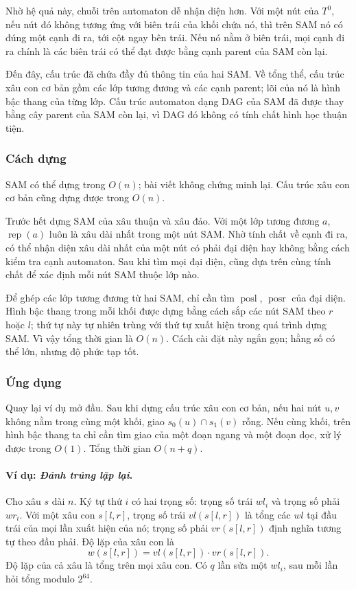 \documentclass[11pt]{article}
\begin{document}
Nhờ hệ quả này, chuỗi trên automaton dễ nhận diện hơn. Với một nút của
\(T^0\), nếu nút đó không tương ứng với biên trái của khối chứa nó, thì trên
SAM nó có đúng một cạnh đi ra, tới cột ngay bên trái. Nếu nó nằm ở biên trái,
mọi cạnh đi ra chính là các biên trái có thể đạt được bằng cạnh parent của
SAM còn lại.

Đến đây, cấu trúc đã chứa đầy đủ thông tin của hai SAM. Về tổng thể, cấu trúc
xâu con cơ bản gồm các lớp tương đương và các cạnh parent; lõi của nó là hình
bậc thang của từng lớp. Cấu trúc automaton dạng DAG của SAM đã được thay bằng
cây parent của SAM còn lại, vì DAG đó không có tính chất hình học thuận tiện.

\subsubsection{Cách dựng}

SAM có thể dựng trong \(O(n)\); bài viết không chứng minh lại. Cấu trúc xâu
con cơ bản cũng dựng được trong \(O(n)\).

Trước hết dựng SAM của xâu thuận và xâu đảo. Với một lớp tương đương \(a\),
\(\operatorname{rep}(a)\) luôn là xâu dài nhất trong một nút SAM. Nhờ tính chất
về cạnh đi ra, có thể nhận diện xâu dài nhất của một nút có phải đại diện hay
không bằng cách kiểm tra cạnh automaton. Sau khi tìm mọi đại diện, cũng dựa
trên cùng tính chất để xác định mỗi nút SAM thuộc lớp nào.

Để ghép các lớp tương đương từ hai SAM, chỉ cần tìm
\(\operatorname{posl}\), \(\operatorname{posr}\) của đại diện. Hình bậc thang
trong mỗi khối được dựng bằng cách sắp các nút SAM theo \(r\) hoặc \(l\); thứ
tự này tự nhiên trùng với thứ tự xuất hiện trong quá trình dựng SAM. Vì vậy
tổng thời gian là \(O(n)\). Cách cài đặt này ngắn gọn; hằng số có thể lớn,
nhưng độ phức tạp tốt.

\subsubsection{Ứng dụng}

Quay lại ví dụ mở đầu. Sau khi dựng cấu trúc xâu con cơ bản, nếu hai nút
\(u,v\) không nằm trong cùng một khối, giao \(s_0(u)\cap s_1(v)\) rỗng. Nếu
cùng khối, trên hình bậc thang ta chỉ cần tìm giao của một đoạn ngang và một
đoạn dọc, xử lý được trong \(O(1)\). Tổng thời gian \(O(n+q)\).

\paragraph{Ví dụ: \emph{Đánh trúng lặp lại}.}
Cho xâu \(s\) dài \(n\). Ký tự thứ \(i\) có hai trọng số: trọng số trái
\(wl_i\) và trọng số phải \(wr_i\). Với một xâu con \(s[l,r]\), trọng số trái
\(vl(s[l,r])\) là tổng các \(wl\) tại đầu trái của mọi lần xuất hiện của nó;
trọng số phải \(vr(s[l,r])\) định nghĩa tương tự theo đầu phải. Độ lặp của
xâu con là
\[
  w(s[l,r])=vl(s[l,r])\cdot vr(s[l,r]).
\]
Độ lặp của cả xâu là tổng trên mọi xâu con. Có \(q\) lần sửa một \(wl_i\), sau
mỗi lần hỏi tổng modulo \(2^{64}\).
\end{document}
